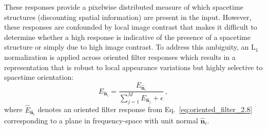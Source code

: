 These responses provide a pixelwise distributed measure
of which spacetime structures (discounting spatial information) are
present in the input.
However, these responses are confounded by local image
contrast that makes 
it difficult to determine
whether a high response is indicative of the presence of
a spacetime structure or simply due to high image
contrast.
To address this ambiguity, an $\textrm{L}_1$
normalization is applied across oriented filter responses which
results in a representation that is robust to local
appearance variations but highly selective to 
spacetime orientation:
\begin{equation}
	\hat{E}_{\hat{\mathbf{n}}_i} = \frac{E_{\hat{\mathbf{n}}_i}}{\sum_{j = 1}^{M}{E_{\hat{\mathbf{n}}_j}} + \epsilon} \ ,
\end{equation}
where $\hat{E}_{\hat{\mathbf{n}}_i}$ denotes an oriented filter response from Eq.\ \ref{eq:oriented_filter_2.8} corresponding to a plane in frequency-space with unit normal $\hat{\mathbf{n}}_i$.
